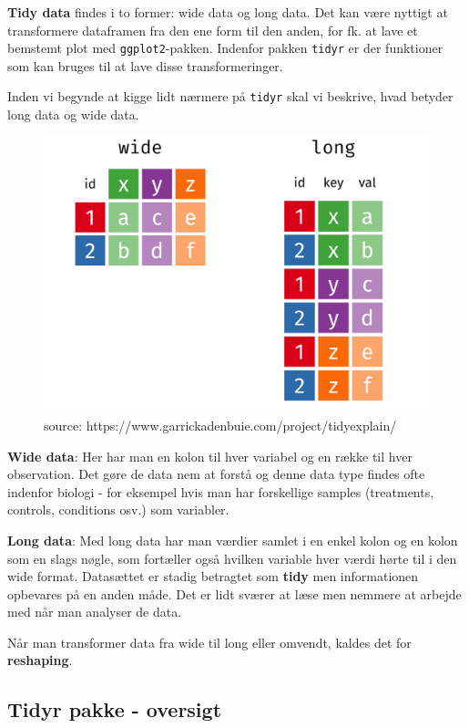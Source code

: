\documentclass[
]{book}
\begin{document}
\textbf{Tidy data} findes i to former: wide data og long data. Det kan være nyttigt at transformere dataframen fra den ene form til den anden, for fk. at lave et bemstemt plot med \texttt{ggplot2}-pakken. Indenfor pakken \texttt{tidyr} er der funktioner som kan bruges til at lave disse transformeringer.

Inden vi begynde at kigge lidt nærmere på \texttt{tidyr} skal vi beskrive, hvad betyder long data og wide data.

\begin{figure}
\includegraphics[width=0.75\linewidth]{plots/original-dfs-tidy} \caption{source: https://www.garrickadenbuie.com/project/tidyexplain/}\label{fig:unnamed-chunk-301}
\end{figure}

\textbf{Wide data}: Her har man en kolon til hver variabel og en række til hver observation. Det gøre de data nem at forstå og denne data type findes ofte indenfor biologi - for eksempel hvis man har forskellige samples (treatments, controls, conditions osv.) som variabler.

\textbf{Long data}: Med long data har man værdier samlet i en enkel kolon og en kolon som en slags nøgle, som fortæller også hvilken variable hver værdi hørte til i den wide format. Datasættet er stadig betragtet som \textbf{tidy} men informationen opbevares på en anden måde. Det er lidt sværer at læse men nemmere at arbejde med når man analyser de data.

Når man transformer data fra wide til long eller omvendt, kaldes det for \textbf{reshaping}.

\hypertarget{tidyr-pakke---oversigt}{%
\subsection{Tidyr pakke - oversigt}\label{tidyr-pakke---oversigt}}
\end{document}
